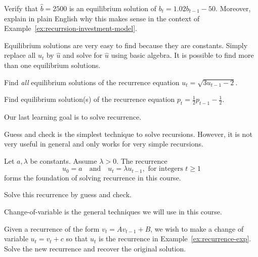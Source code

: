 \documentclass[../main.tex]{subfiles}
\begin{document}
\begin{example}
  Verify that \(\hat{b} = 2500\) is an equilibrium solution of \(b_{t} = 1.02 b_{t-1} - 50\).  Moreover, explain in plain English why this makes sense in the context of Example~\ref{ex:recurrsion-investment-model}.
\end{example}

\faStar{} Equilibrium solutions are very easy to find because they are constants. Simply replace all \(u_{t}\) by \(\hat{u}\) and solve for \(\hat{u}\) using basic algebra. It is possible to find more than one equilibrium solutions.

\begin{example}
  Find \emph{all} equilibrium solutions of the recurrence equation \(u_{t} = \sqrt{3 u_{t-1} - 2}\).
\end{example}
\clearpage

\begin{example}
  Find equilibrium solution(s) of the recurrence equation \(p_{t} = \frac{1}{2} p_{t-1} - \frac{1}{2}\).
\end{example}

Our last learning goal is to solve recurrence.

Guess and check is the simplest technique to solve recursions. However, it is not very useful in general and only works for very simple recursions.
\begin{example}[important] \label{ex:recurrence-exp}
  Let \(a,\lambda\) be constants. Assume \(\lambda > 0\). The recurrence 
  \[ 
    u_{0} = a \quad\text{and}\quad u_{t} = \lambda u_{t-1}, \text{ for integers } t \ge 1 
  \] 
  forms the foundation of solving recurrence in this course. 
  
  Solve this recurrence by guess and check.
\end{example}

\clearpage

Change-of-variable is the general techniques we will use in this course. 

\begin{method}
  Given a recurrence of the form \(v_{t} = A v_{t-1} + B\), we wish to make a change of variable \(u_{t} = v_{t} + c\) so that \(u_{t}\) is the recurrence in Example~\ref{ex:recurrence-exp}. Solve the new recurrence and recover the original solution.
\end{method}
\end{document}
